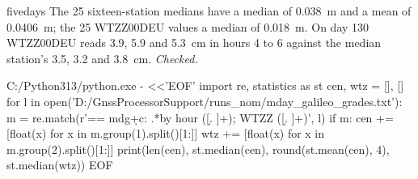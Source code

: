 \begin{answer}{fivedays}
\solution
The 25 sixteen-station medians have a median of 0.038~m and a mean of 0.0406~m; the 25
WTZZ00DEU values a median of 0.018~m. On day 130 WTZZ00DEU reads 3.9, 5.9 and 5.3~cm in
hours 4 to 6 against the median station's 3.5, 3.2 and 3.8~cm. \emph{Checked.}
\chk
\begin{cmd}
C:/Python313/python.exe - <<'EOF'
import re, statistics as st
cen, wtz = [], []
for l in open('D:/GnssProcessorSupport/runs_nom/mday_galileo_grades.txt'):
    m = re.match(r'== mdg\d+c: .*by hour ([\d. ]+); WTZZ ([\d. ]+)', l)
    if m:
        cen += [float(x) for x in m.group(1).split()[1:]]
        wtz += [float(x) for x in m.group(2).split()[1:]]
print(len(cen), st.median(cen), round(st.mean(cen), 4), st.median(wtz))
EOF
\end{cmd}
\end{answer}


